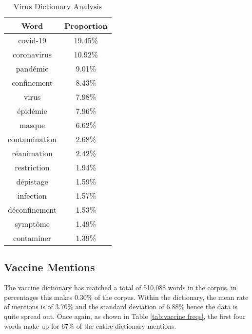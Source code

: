 \begin{table}[]
\caption{Virus Dictionary Analysis}
\label{tab:virus freqs}
\centering
\begin{tabular}{@{}cc@{}}
\toprule
Word      & Proportion \\ \midrule
covid-19      & 19.45\% \\
coronavirus   & 10.92\% \\
pandémie      & 9.01\%  \\
confinement   & 8.43\%  \\
virus         & 7.98\%  \\
épidémie      & 7.96\%  \\
masque        & 6.62\%  \\
contamination & 2.68\%  \\
réanimation   & 2.42\%  \\
restriction   & 1.94\%  \\
dépistage     & 1.59\%  \\
infection     & 1.57\%  \\
déconfinement & 1.53\%  \\
symptôme      & 1.49\%  \\
contaminer    & 1.39\%  \\ \bottomrule
\end{tabular}
\end{table}

\subsection{Vaccine Mentions}

The vaccine dictionary has matched a total of 510,088 words in the corpus, in percentages this makes 0.30\% of the corpus. Within the dictionary, the mean rate of mentions is of 3.70\% and the standard deviation of 6.88\% hence the data is quite spread out. Once again, as shown in Table \ref{tab:vaccine freqs}, the first four words make up for 67\% of the entire dictionary mentions.

